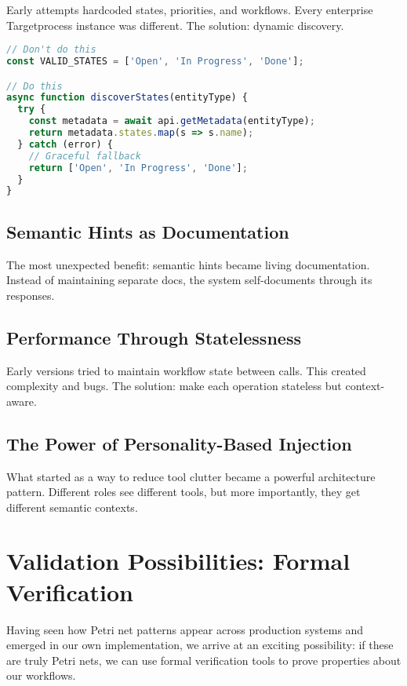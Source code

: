 \documentclass[11pt,a4paper]{article}
\begin{document}
Early attempts hardcoded states, priorities, and workflows. Every enterprise Targetprocess instance was different. The solution: dynamic discovery.

\begin{lstlisting}[language=JavaScript]
// Don't do this
const VALID_STATES = ['Open', 'In Progress', 'Done'];

// Do this
async function discoverStates(entityType) {
  try {
    const metadata = await api.getMetadata(entityType);
    return metadata.states.map(s => s.name);
  } catch (error) {
    // Graceful fallback
    return ['Open', 'In Progress', 'Done'];
  }
}
\end{lstlisting}

\subsection{Semantic Hints as Documentation}

The most unexpected benefit: semantic hints became living documentation. Instead of maintaining separate docs, the system self-documents through its responses.

\subsection{Performance Through Statelessness}

Early versions tried to maintain workflow state between calls. This created complexity and bugs. The solution: make each operation stateless but context-aware.

\subsection{The Power of Personality-Based Injection}

What started as a way to reduce tool clutter became a powerful architecture pattern. Different roles see different tools, but more importantly, they get different semantic contexts.

\section{Validation Possibilities: Formal Verification}

Having seen how Petri net patterns appear across production systems and emerged in our own implementation, we arrive at an exciting possibility: if these are truly Petri nets, we can use formal verification tools to prove properties about our workflows.
\end{document}

